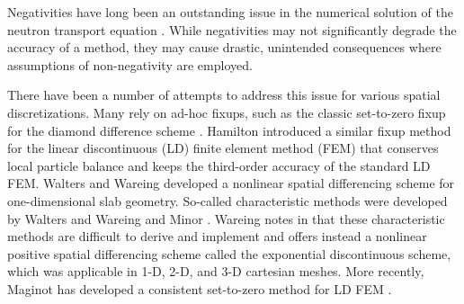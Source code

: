 Negativities have long been an outstanding issue in the numerical solution
of the neutron transport equation \cite{lanthrop}. While negativities
may not significantly degrade the accuracy of a method, they may cause
drastic, unintended consequences where assumptions of non-negativity
are employed.

There have been a number of attempts to address this issue for various
spatial discretizations. Many rely on ad-hoc fixups, such as the classic
set-to-zero fixup for the diamond difference scheme \cite{lewis}.
Hamilton \cite{hamilton} introduced a similar fixup method for the
linear discontinuous (LD) finite element method (FEM) that conserves local
particle balance and keeps the third-order accuracy of the standard
LD FEM. Walters and Wareing \cite{walters} developed a nonlinear
spatial differencing scheme for one-dimensional slab geometry.
So-called characteristic methods were developed by Walters and Wareing
\cite{walters_NC} and Minor \cite{minor}.
Wareing notes in \cite{wareing} that these characteristic methods
are difficult to derive and implement and offers instead
a nonlinear positive spatial differencing scheme called
the exponential discontinuous scheme, which was applicable in 1-D,
2-D, and 3-D cartesian meshes. More recently, Maginot has
developed a consistent set-to-zero method for LD FEM \cite{maginot}.
